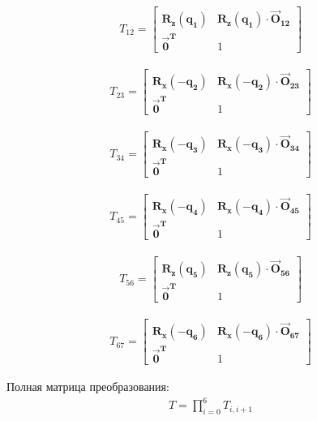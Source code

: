 \begin{align*}
	T_{12} = \begin{bmatrix}
		\boldsymbol{R_{z}(q_{1})}		&		\boldsymbol{R_{z}(q_{1}) \cdot \vec{O}_{12}}\\
		\boldsymbol{\vec{0}^{T}}		&		1
	\end{bmatrix}
\end{align*}

\begin{align*}
	T_{23} = \begin{bmatrix}
		\boldsymbol{R_{x}(-q_{2})}		&		\boldsymbol{R_{x}(-q_{2}) \cdot \vec{O}_{23}}\\
		\boldsymbol{\vec{0}^{T}}		&		1
	\end{bmatrix}
\end{align*}

\begin{align*}
	T_{34} = \begin{bmatrix}
		\boldsymbol{R_{x}(-q_{3})}		&		\boldsymbol{R_{x}(-q_{3}) \cdot \vec{O}_{34}}\\
		\boldsymbol{\vec{0}^{T}}		&		1
	\end{bmatrix}
\end{align*}

\begin{align*}
	T_{45} = \begin{bmatrix}
		\boldsymbol{R_{x}(-q_{4})}		&		\boldsymbol{R_{x}(-q_{4}) \cdot \vec{O}_{45}}\\
		\boldsymbol{\vec{0}^{T}}		&		1
	\end{bmatrix}
\end{align*}

\begin{align*}
	T_{56} = \begin{bmatrix}
		\boldsymbol{R_{z}(q_{5})}		&		\boldsymbol{R_{z}(q_{5}) \cdot \vec{O}_{56}}\\
		\boldsymbol{\vec{0}^{T}}		&		1
	\end{bmatrix}
\end{align*}

\begin{align*}
	T_{67} = \begin{bmatrix}
		\boldsymbol{R_{x}(-q_{6})}		&		\boldsymbol{R_{x}(-q_{6}) \cdot \vec{O}_{67}}\\
		\boldsymbol{\vec{0}^{T}}		&		1
	\end{bmatrix}
\end{align*}

\bigbreak
Полная матрица преобразования:
\begin{align*}
	T = \prod_{i=0}^{6}T_{i,i+1}
\end{align*}

